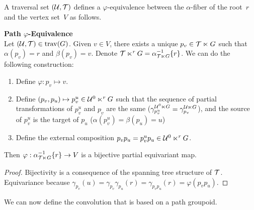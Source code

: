 A traversal set $(\mathcal{U}, \mathcal{T})$ defines a $\varphi$-equivalence between the $\alpha$-fiber of the root~$r$ and the vertex set~$V$ as follows.

\begin{lemma}\textbf{Path $\varphi$-Equivalence}\\
Let $(\mathcal{U}, \mathcal{T}) \in \operatorname{trav}(G)$. Given $v \in V$, there exists a unique $p_v \in \mathcal{T} \ltimes G$ such that $\alpha(p_v) = r$ and $\beta(p_v) = v$. Denote $\mathcal{T} \ltimes^r G = \alpha^{-1}_{\mathcal{T} \ltimes G}\{r\}$. We can do the following construction:
\begin{enumerate}
  \item Define $\varphi: p_v \mapsto v$.
  \item Define $(p_v, p_u) \mapsto p_v^u \in \mathcal{U}^0 \ltimes^r G$ such that the sequence of partial transformations of $p_v^u$ and $p_v$ are the same (\ie $\gamma_{p_v^u}^{\mathcal{U}^0 \ltimes G} = \gamma_{p_v}^{\mathcal{U} \ltimes G}$), and the source of $p_v^u$ is the target of $p_u$ (\ie $\alpha(p_v^u) = \beta(p_u) = u$)
  \item Define the external composition $p_vp_u = p_v^up_u \in \mathcal{U}^0 \ltimes^r G$.
\end{enumerate}
Then $\varphi: \alpha^{-1}_{\mathcal{T} \ltimes G}\{r\} \rightarrow V$ is a bijective partial equivariant map.
\end{lemma}


\begin{proof}
Bijectivity is a consequence of the spanning tree structure of $\mathcal{T}$.
Equivariance because $\gamma_{p_v}(u) = \gamma_{p_v}\gamma_{p_u}(r) = \gamma_{p_vp_u}(r) = \varphi(p_vp_u)$.
\end{proof}

We can now define the convolution that is based on a path groupoid.


